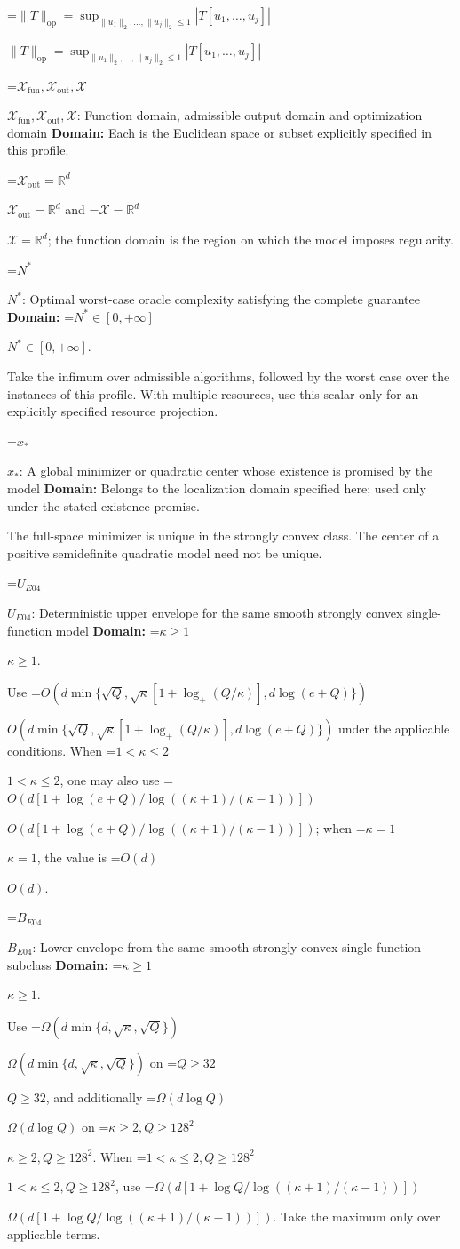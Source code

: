 \documentclass[10pt,a4paper]{article}
\newcommand{\AtlasMath}[1]{\par\begingroup\centering\setbox0=\hbox{$\displaystyle #1$}\ifdim\wd0>1.4\linewidth\typeout{ATLAS WIDE FORMULA: \the\wd0}\fi\ifdim\wd0>\linewidth\resizebox{\linewidth}{!}{\box0}\else\box0\fi\par\endgroup}
\newcommand{\AtlasInlineMath}[1]{\begingroup\setbox0=\hbox{$#1$}\ifdim\wd0>.4\linewidth\endgroup\AtlasMath{#1}\else\endgroup$#1$\fi}
\begin{document}
\AtlasInlineMath{\|T\|_{\mathrm{op}}=\sup_{\|u_1\|_2,\ldots,\|u_j\|_2\le1}|T[u_1,\ldots,u_j]|}

\AtlasInlineMath{\mathcal{X}_{\mathrm{fun}},\mathcal{X}_{\mathrm{out}},\mathcal{X}}: Function domain, admissible output domain and optimization domain \textbf{Domain:} Each is the Euclidean space or subset explicitly specified in this profile.

\AtlasInlineMath{\mathcal{X}_{\mathrm{out}}=\mathbb{R}^d} and \AtlasInlineMath{\mathcal{X}=\mathbb{R}^d}; the function domain is the region on which the model imposes regularity.

\AtlasInlineMath{N^*}: Optimal worst-case oracle complexity satisfying the complete guarantee \textbf{Domain:} \AtlasInlineMath{N^*\in[0,+\infty]}.

Take the infimum over admissible algorithms, followed by the worst case over the instances of this profile. With multiple resources, use this scalar only for an explicitly specified resource projection.

\AtlasInlineMath{x_*}: A global minimizer or quadratic center whose existence is promised by the model \textbf{Domain:} Belongs to the localization domain specified here; used only under the stated existence promise.

The full-space minimizer is unique in the strongly convex class. The center of a positive semidefinite quadratic model need not be unique.

\AtlasInlineMath{U_{E04}}: Deterministic upper envelope for the same smooth strongly convex single-function model \textbf{Domain:} \AtlasInlineMath{\kappa\ge1}.

Use \AtlasInlineMath{O(d\min\{\sqrt Q,\sqrt\kappa[1+\log_+(Q/\kappa)],d\log(e+Q)\})} under the applicable conditions. When \AtlasInlineMath{1<\kappa\le2}, one may also use \AtlasInlineMath{O(d[1+\log(e+Q)/\log((\kappa+1)/(\kappa-1))])}; when \AtlasInlineMath{\kappa=1}, the value is \AtlasInlineMath{O(d)}.

\AtlasInlineMath{B_{E04}}: Lower envelope from the same smooth strongly convex single-function subclass \textbf{Domain:} \AtlasInlineMath{\kappa\ge1}.

Use \AtlasInlineMath{\Omega(d\min\{d,\sqrt\kappa,\sqrt Q\})} on \AtlasInlineMath{Q\ge32}, and additionally \AtlasInlineMath{\Omega(d\log Q)} on \AtlasInlineMath{\kappa\ge2,Q\ge128^2}. When \AtlasInlineMath{1<\kappa\le2,Q\ge128^2}, use \AtlasInlineMath{\Omega(d[1+\log Q/\log((\kappa+1)/(\kappa-1))])}. Take the maximum only over applicable terms.
\end{document}
